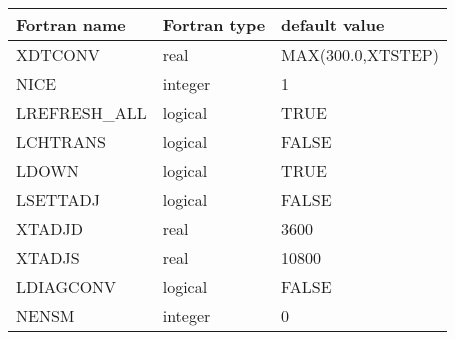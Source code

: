 
\begin{center}
\begin{tabular} {|l|l|l|}
\hline
Fortran name & Fortran type & default value \\
\hline
XDTCONV      &  real         & MAX(300.0,XTSTEP) \\
NICE         &  integer      &   1               \\
LREFRESH\_ALL&  logical      &   TRUE            \\
LCHTRANS     &  logical      &   FALSE           \\
LDOWN        &  logical      &   TRUE            \\
LSETTADJ     &  logical      &   FALSE           \\
XTADJD       &  real         &   3600            \\
XTADJS       &  real         &  10800            \\
LDIAGCONV    &  logical      &   FALSE           \\
NENSM        &  integer      &     0             \\
\hline
\end{tabular}
\end{center}

